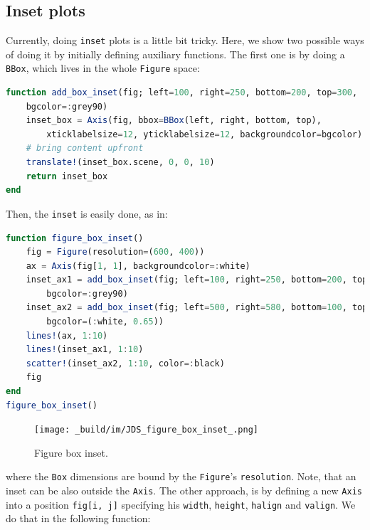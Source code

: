 \documentclass[
  notoc %
]{tufte-book}
\newcommand{\passthrough}[1]{#1}
\begin{document}
\hypertarget{inset-plots}{%
\subsection{Inset plots}\label{inset-plots}}

Currently, doing \passthrough{\lstinline!inset!} plots is a little bit
tricky. Here, we show two possible ways of doing it by initially
defining auxiliary functions. The first one is by doing a
\passthrough{\lstinline!BBox!}, which lives in the whole
\passthrough{\lstinline!Figure!} space:

\begin{lstlisting}[language=Julia]
function add_box_inset(fig; left=100, right=250, bottom=200, top=300,
    bgcolor=:grey90)
    inset_box = Axis(fig, bbox=BBox(left, right, bottom, top),
        xticklabelsize=12, yticklabelsize=12, backgroundcolor=bgcolor)
    # bring content upfront
    translate!(inset_box.scene, 0, 0, 10)
    return inset_box
end
\end{lstlisting}

Then, the \passthrough{\lstinline!inset!} is easily done, as in:

\begin{lstlisting}[language=Julia]
function figure_box_inset()
    fig = Figure(resolution=(600, 400))
    ax = Axis(fig[1, 1], backgroundcolor=:white)
    inset_ax1 = add_box_inset(fig; left=100, right=250, bottom=200, top=300,
        bgcolor=:grey90)
    inset_ax2 = add_box_inset(fig; left=500, right=580, bottom=100, top=200,
        bgcolor=(:white, 0.65))
    lines!(ax, 1:10)
    lines!(inset_ax1, 1:10)
    scatter!(inset_ax2, 1:10, color=:black)
    fig
end
figure_box_inset()
\end{lstlisting}

\begin{figure}
\hypertarget{fig:figure_box_inset}{%
\centering
\texttt{[image: \_build/im/JDS\_figure\_box\_inset\_.png]}
\caption{Figure box inset.}\label{fig:figure_box_inset}
}
\end{figure}

where the \passthrough{\lstinline!Box!} dimensions are bound by the
\passthrough{\lstinline!Figure!}'s \passthrough{\lstinline!resolution!}.
Note, that an inset can be also outside the
\passthrough{\lstinline!Axis!}. The other approach, is by defining a new
\passthrough{\lstinline!Axis!} into a position
\passthrough{\lstinline!fig[i, j]!} specifying his
\passthrough{\lstinline!width!}, \passthrough{\lstinline!height!},
\passthrough{\lstinline!halign!} and \passthrough{\lstinline!valign!}.
We do that in the following function:
\end{document}
